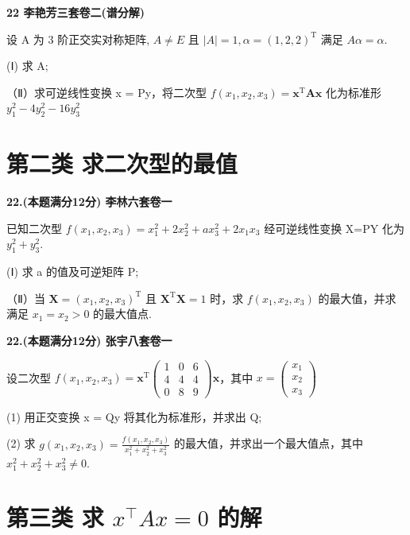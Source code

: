\documentclass[a4paper,12pt]{article}
\begin{document}
\vspace{0.5cm}

\textbf{22 李艳芳三套卷二(谱分解)}

设 A 为 3 阶正交实对称矩阵, $A \neq E$ 且 $|A| = 1, \alpha = (1, 2, 2)^{\mathrm{T}}$ 满足 $A\alpha = \alpha$.

(Ⅰ) 求 A;

（Ⅱ）求可逆线性变换 x = Py，将二次型 $f(x_{1}, x_{2}, x_{3}) = \boldsymbol{x}^{\mathrm{T}} \boldsymbol{A} \boldsymbol{x}$ 化为标准形 $y_{1}^{2} - 4y_{2}^{2} - 16y_{3}^{2}$

\section{第二类 求二次型的最值}

\textbf{22.(本题满分12分) 李林六套卷一}

已知二次型 $f(x_{1},x_{2},x_{3})=x_{1}^{2}+2x_{2}^{2}+ax_{3}^{2}+2x_{1}x_{3}$ 经可逆线性变换 X=PY 化为 $y_{1}^{2}+y_{3}^{2}$.

(Ⅰ) 求 a 的值及可逆矩阵 P;

（Ⅱ）当 $\boldsymbol{X} = (x_{1}, x_{2}, x_{3})^{\mathrm{T}}$ 且 $\boldsymbol{X}^{\mathrm{T}} \boldsymbol{X} = 1$ 时，求 $f(x_{1}, x_{2}, x_{3})$ 的最大值，并求满足 $x_{1} = x_{2} > 0$ 的最大值点.

\vspace{0.5cm}

\textbf{22.(本题满分12分) 张宇八套卷一}

设二次型 $f(x_{1},x_{2},x_{3})=\boldsymbol{x}^{\mathrm{T}}\begin{pmatrix}1&0&6\\4&4&4\\0&8&9\end{pmatrix}\boldsymbol{x}$，其中 $x=\begin{pmatrix}x_{1}\\x_{2}\\x_{3}\end{pmatrix}$

(1) 用正交变换 x = Qy 将其化为标准形，并求出 Q;

(2) 求 $g(x_{1}, x_{2}, x_{3}) = \frac{f(x_{1}, x_{2}, x_{3})}{x_{1}^{2} + x_{2}^{2} + x_{3}^{2}}$ 的最大值，并求出一个最大值点，其中 $x_{1}^{2} + x_{2}^{2} + x_{3}^{2} \neq 0$.

\section{第三类 求 $x^{\top}Ax=0$ 的解}
\end{document}
